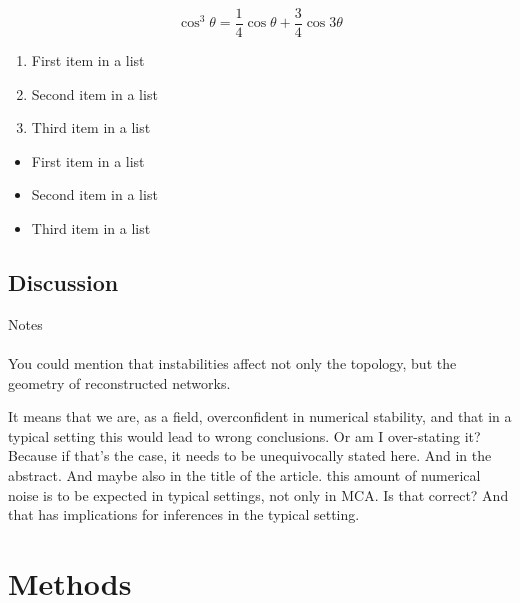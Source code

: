 \documentclass[fleqn,10pt]{SelfArx} %
\begin{document}
\begin{equation}
\cos^3 \theta =\frac{1}{4}\cos\theta+\frac{3}{4}\cos 3\theta
\label{eq:refname2}
\end{equation}

\lipsum[5] %

\begin{enumerate}[noitemsep] %
\item First item in a list
\item Second item in a list
\item Third item in a list
\end{enumerate}

\lipsum[14] %

\begin{itemize}[noitemsep] %
\item First item in a list
\item Second item in a list
\item Third item in a list
\end{itemize}

\subsection{Discussion}
{\color{orange}Notes\\\\
You could mention that instabilities affect not only the topology, but the geometry of reconstructed networks.

It means that we are, as a field, overconfident in numerical stability, and that in a typical setting this would lead
to wrong conclusions. Or am I over-stating it? Because if that's the case, it needs to be unequivocally stated here.
And in the abstract. And maybe also in the title of the article. this amount of numerical noise is to be expected in
typical settings, not only in MCA. Is that correct? And that has implications for inferences in the typical setting.
}




\section*{Methods}
\lipsum[10]
\end{document}
